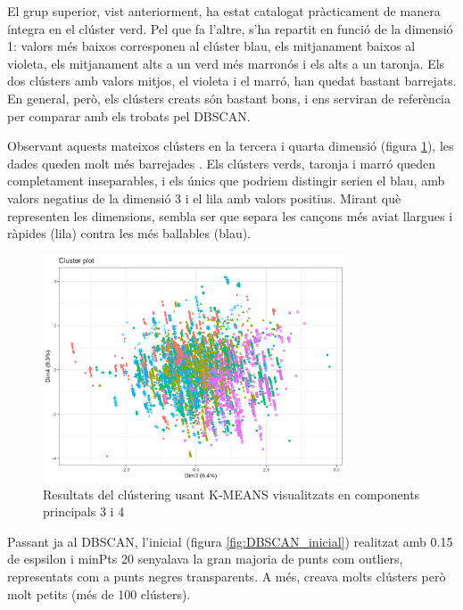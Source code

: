 \documentclass{article}
\begin{document}
El grup superior, vist anteriorment, ha estat catalogat pràcticament de manera íntegra en el clúster verd. Pel que fa l’altre, s’ha repartit en funció de la dimensió 1: valors més baixos corresponen al clúster blau, els mitjanament baixos al violeta, els mitjanament alts a un verd més marronós i els alts a un taronja. Els dos clústers amb valors mitjos, el violeta i el marró, han quedat bastant barrejats. En general, però, els clústers creats són bastant bons, i ens serviran de referència per comparar amb els trobats pel DBSCAN.

Observant aquests mateixos clústers en la tercera i quarta dimensió (figura \ref{fig:KMEANS_34}), les dades queden molt més barrejades . Els clústers verds, taronja i marró queden completament inseparables, i els únics que podriem distingir serien el blau, amb valors negatius de la dimensió 3 i el lila amb valors positius. Mirant què representen les dimensions, sembla ser que separa les cançons més aviat llargues i ràpides (lila) contra les més ballables (blau).

\begin{figure}[H]
    \centering
    \includegraphics[width=0.8\textwidth]{Images/4_clustering/DBSCAN/kmeans34.png}
    \caption{Resultats del clústering usant K-MEANS visualitzats en components principals 3 i 4}
    \label{fig:KMEANS_34}
\end{figure}

Passant ja al DBSCAN, l’inicial (figura \ref{fig:DBSCAN_inicial}) realitzat amb 0.15 de espsilon i minPts 20 senyalava la gran majoria de punts com outliers, representats com a punts negres transparents. A més, creava molts clústers però molt petits (més de 100 clústers).
\end{document}

